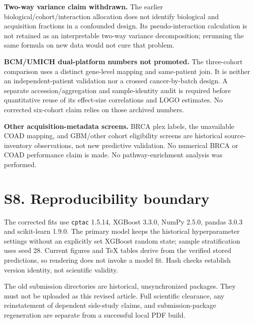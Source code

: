 \documentclass[11pt]{article}
\begin{document}
\textbf{Two-way variance claim withdrawn.}
The earlier biological/cohort/interaction allocation does not identify
biological and acquisition fractions in a confounded design. Its
pseudo-interaction calculation is not retained as an interpretable
two-way variance decomposition; rerunning the same formula on new
data would not cure that problem.

\textbf{BCM/UMICH dual-platform numbers not promoted.}
The three-cohort comparison uses a distinct gene-level mapping and
same-patient join. It is neither an independent-patient validation nor
a crossed cancer-by-batch design. A separate accession/aggregation and
sample-identity audit is required before quantitative reuse of its
effect-size correlations and LOGO estimates. No corrected six-cohort
claim relies on those archived numbers.

\textbf{Other acquisition-metadata screens.}
BRCA plex labels, the unavailable COAD mapping, and GBM/other cohort
eligibility screens are historical source-inventory observations,
not new predictive validation. No numerical BRCA or COAD performance
claim is made. No pathway-enrichment analysis was performed.

\section*{S8. Reproducibility boundary}

The corrected fits use \texttt{cptac} 1.5.14, XGBoost 3.3.0, NumPy
2.5.0, pandas 3.0.3 and scikit-learn 1.9.0. The primary model keeps the
historical hyperparameter settings without an explicitly set XGBoost
random state; sample stratification uses seed 28. Current figures and
TeX tables derive from the verified stored predictions, so rendering
does not invoke a model fit. Hash checks establish version identity,
not scientific validity.

The old submission directories are historical, unsynchronized packages.
They must not be uploaded as this revised article. Full scientific
clearance, any reinstatement of dependent side-study claims, and
submission-package regeneration are separate from a successful local
PDF build.
\end{document}
